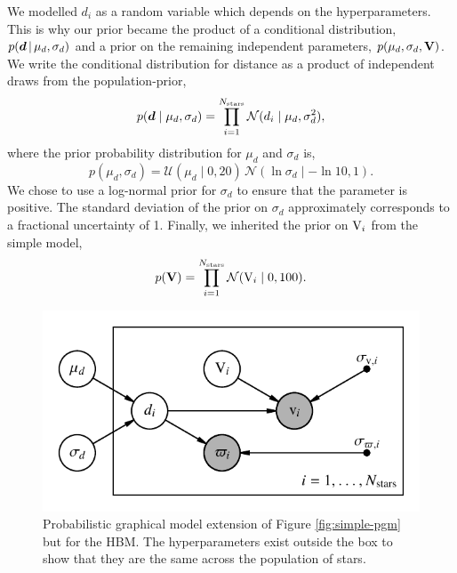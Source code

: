 We modelled \(d_i\) as a random variable which depends on the hyperparameters. This is why our prior became the product of a conditional distribution, \(p(\bm{d} \,|\, \mu_d, \sigma_d)\) and a prior on the remaining independent parameters, \(p(\mu_d, \sigma_d, \bm{\mathrm{V}})\). We write the conditional distribution for distance as a product of independent draws from the population-prior,
%
\begin{equation}
    p(\bm{d} \mid \mu_d, \sigma_d) = \prod_{i=1}^{N_\mathrm{stars}} \mathcal{N}(d_i \mid \mu_d, \sigma_d^2),
\end{equation}
%
where the prior probability distribution for \(\mu_d\) and \(\sigma_d\) is,
%
\begin{equation}
    p(\mu_d, \sigma_d) = \mathcal{U}(\mu_d \mid 0, 20) \, \mathcal{N}(\ln\sigma_d \mid - \ln 10, 1).
\end{equation}
%
We chose to use a log-normal prior for \(\sigma_d\) to ensure that the parameter is positive. The standard deviation of the prior on \(\sigma_d\) approximately corresponds to a fractional uncertainty of 1. Finally, we inherited the prior on \(\mathrm{V}_i\) from the simple model,
%
\begin{equation}
    p(\bm{\mathrm{V}}) = \prod_{i=1}^{N_\mathrm{stars}} \mathcal{N}(\mathrm{V}_i \mid 0, 100).
\end{equation}
%

\begin{figure}[tb]
    \centering
    \includegraphics{figures/hbm-pgm.pdf}
    \caption[Probabilistic graphical model for the hierarchical model]{Probabilistic graphical model extension of Figure \ref{fig:simple-pgm} but for the HBM. The hyperparameters exist outside the box to show that they are the same across the population of stars.}
    \label{fig:hbm-pgm}
\end{figure}

